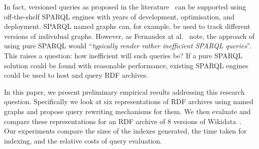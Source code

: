 \documentclass[a4paper]{llncs}
\begin{document}


In fact, versioned queries as proposed in the literature~\cite{FernandezPU15} can be supported using off-the-shelf SPARQL engines with years of development, optimisation, and deployment. SPARQL named graphs can, for example, be used to track different versions of individual graphs. However, as Fernandez at al.~\cite{FernandezUPK19} note, the approach of using pure SPARQL would ``\textit{typically render rather inefficient SPARQL queries}''. This raises a question: how inefficient will such queries be? If a pure SPARQL solution could be found with reasonable performance, existing SPARQL engines could be used to host and query RDF archives.

In this paper, we present preliminary empirical results addressing this research question. Specifically we look at six representations of RDF archives using named graphs and propose query rewriting mechanisms for them. We then evaluate and compare these representations for an RDF archive of 8 versions of Wikidata~\cite{VrandecicK14}. Our experiments compare the sizes of the indexes generated, the time taken for indexing, and the relative costs of query evaluation.

\end{document}
